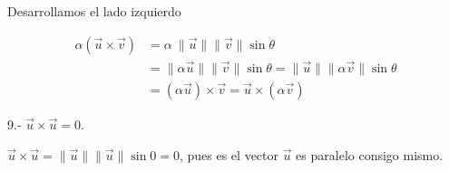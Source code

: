 \documentclass{article}
\begin{document}
Desarrollamos el lado izquierdo

\begin{equation}
\begin{split}
\alpha\left(\vec{u}\times\vec{v}\right)  & = \alpha\ \|\vec{u}\| \|\vec{v}\| \sin{\theta} \\
& = \| \alpha \vec{u} \| \|\vec{v}\| \sin{\theta} = \| \vec{u} \| \|\alpha \vec{v}\| \sin{\theta}\\
& = \boxed{(\alpha \vec{u}) \times \vec{v}} = \boxed{\vec{u} \times (\alpha  \vec{v})}  
\end{split}
\end{equation}

9.- $\vec{u} \times \vec{u}=0$. 

$\vec{u} \times \vec{u} = \|\vec{u}\|  \|\vec{u}\| \sin{0} = 0 $, pues es el vector $\vec{u}$ es paralelo consigo mismo.
\end{document}
